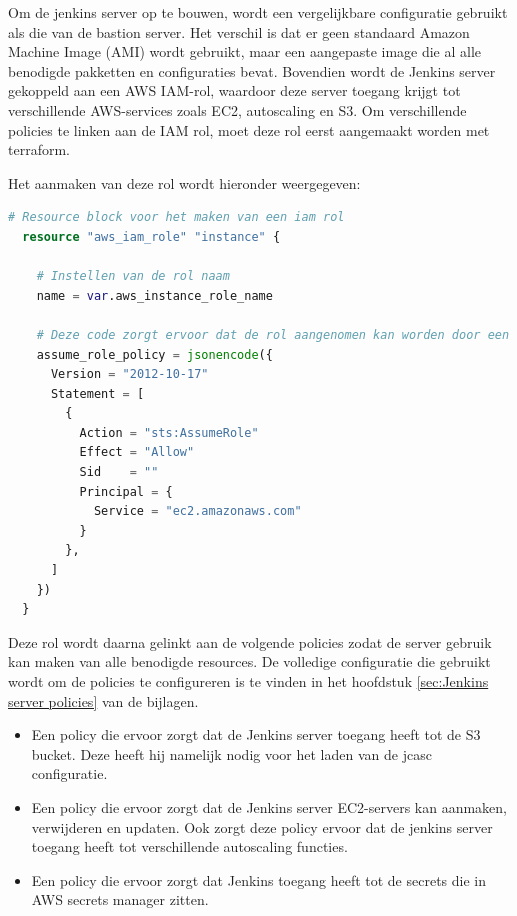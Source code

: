 Om de jenkins server op te bouwen, wordt een vergelijkbare configuratie gebruikt als die van de bastion server. Het verschil is dat er geen standaard Amazon Machine Image (AMI) wordt gebruikt, maar een aangepaste image die al alle benodigde pakketten en configuraties bevat. Bovendien wordt de Jenkins server gekoppeld aan een AWS IAM-rol, waardoor deze server toegang krijgt tot verschillende AWS-services zoals EC2, autoscaling en S3. Om verschillende policies te linken aan de IAM rol, moet deze rol eerst aangemaakt worden met terraform. 
\newline

Het aanmaken van deze rol wordt hieronder weergegeven:
\newline

\begin{lstlisting}[language=terraform]
  # Resource block voor het maken van een iam rol  
  resource "aws_iam_role" "instance" {

    # Instellen van de rol naam
    name = var.aws_instance_role_name
  
    # Deze code zorgt ervoor dat de rol aangenomen kan worden door een ec2 instance
    assume_role_policy = jsonencode({
      Version = "2012-10-17"
      Statement = [
        {
          Action = "sts:AssumeRole"
          Effect = "Allow"
          Sid    = ""
          Principal = {
            Service = "ec2.amazonaws.com"
          }
        },
      ]
    })
  }
\end{lstlisting}

\vspace{0.5cm}
Deze rol wordt daarna gelinkt aan de volgende policies zodat de server gebruik kan maken van alle benodigde resources. De volledige configuratie die gebruikt wordt om de policies te configureren is te vinden in het hoofdstuk \ref{sec:Jenkins server policies} van de bijlagen.

\begin{itemize}
  \item Een policy die ervoor zorgt dat de Jenkins server toegang heeft tot de S3 bucket. Deze heeft hij namelijk nodig voor het laden van de jcasc configuratie.
  \item Een policy die ervoor zorgt dat de Jenkins server EC2-servers kan aanmaken, verwijderen en updaten. Ook zorgt deze policy ervoor dat de jenkins server toegang heeft tot verschillende autoscaling functies.
  \item Een policy die ervoor zorgt dat Jenkins toegang heeft tot de secrets die in AWS secrets manager zitten.
\end{itemize}

